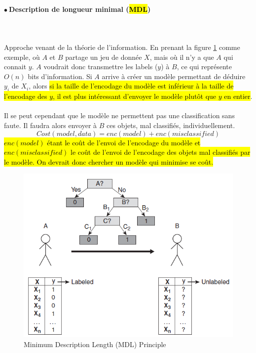 \documentclass[letterpaper, 12pt]{article}
\newcommand{\point}{$\bullet\ $}
\begin{document}
			\paragraph{\point Description de longueur minimal (\hl{MDL})}~\\~\\
				Approche venant de la théorie de l'information.
				En prenant la figure \ref{fig:mdl} comme exemple,
				où $A$ et $B$ partage un jeu de donnée $X$, mais où il
				n'y a que $A$ qui connait $y$.
				$A$ voudrait donc transmettre les labels ($y$)
				à $B$, ce qui représente $O(n)$ bits d'information.
				Si $A$ arrive à créer un modèle permettant de déduire
				$y_i$ de $X_i$, alors \hl{si la taille de l'encodage
				du modèle est inférieur à la taille de l'encodage
				des $y$, il est plus intéressant d'envoyer le modèle
				plutôt que $y$ en entier}.\\
				~\\
				Il se peut cependant que le modèle ne permettent pas une
				classification sans faute. Il faudra alors envoyer à $B$
				ces objets, mal classifiés, individuellement.
				$$ Cost(model, data) = enc(model) + enc(misclassified) $$
				\hl{$enc(model)$ étant le coût de l'envoi de l'encodage du
				modèle
				et $enc(misclassified)$ le coût de l'envoi de l'encodage
				des objets mal classifiés par le modèle.
				On devrait donc chercher un modèle qui minimise se coût.}	
				\begin{figure}[H]
					\centering
					\includegraphics[scale=1.0]{Images/mdl.png}
					\caption{Minimum Description Length (MDL) Principle}
					\label{fig:mdl}
				\end{figure}\noindent
			\newpage
\end{document}
